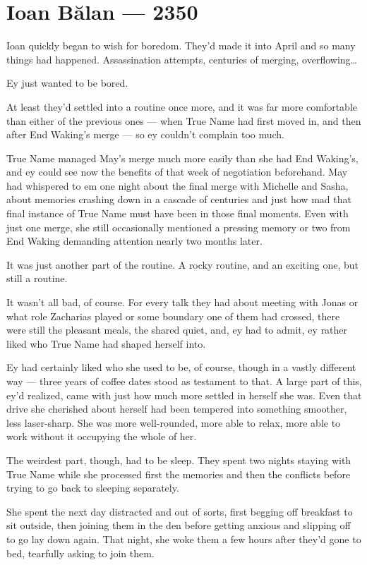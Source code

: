 \hypertarget{ioan-bux103lan-2350}{%
\chapter{Ioan Bălan — 2350}\label{ioan-bux103lan-2350}}

Ioan quickly began to wish for boredom. They'd made it into April and so many things had happened. Assassination attempts, centuries of merging, overflowing\ldots{}

Ey just wanted to be bored.

At least they'd settled into a routine once more, and it was far more comfortable than either of the previous ones — when True Name had first moved in, and then after End Waking's merge — so ey couldn't complain too much.

True Name managed May's merge much more easily than she had End Waking's, and ey could see now the benefits of that week of negotiation beforehand. May had whispered to em one night about the final merge with Michelle and Sasha, about memories crashing down in a cascade of centuries and just how mad that final instance of True Name must have been in those final moments. Even with just one merge, she still occasionally mentioned a pressing memory or two from End Waking demanding attention nearly two months later.

It was just another part of the routine. A rocky routine, and an exciting one, but still a routine.

It wasn't all bad, of course. For every talk they had about meeting with Jonas or what role Zacharias played or some boundary one of them had crossed, there were still the pleasant meals, the shared quiet, and, ey had to admit, ey rather liked who True Name had shaped herself into.

Ey had certainly liked who she used to be, of course, though in a vastly different way — three years of coffee dates stood as testament to that. A large part of this, ey'd realized, came with just how much more settled in herself she was. Even that drive she cherished about herself had been tempered into something smoother, less laser-sharp. She was more well-rounded, more able to relax, more able to work without it occupying the whole of her.

The weirdest part, though, had to be sleep. They spent two nights staying with True Name while she processed first the memories and then the conflicts before trying to go back to sleeping separately.

She spent the next day distracted and out of sorts, first begging off breakfast to sit outside, then joining them in the den before getting anxious and slipping off to go lay down again. That night, she woke them a few hours after they'd gone to bed, tearfully asking to join them.

